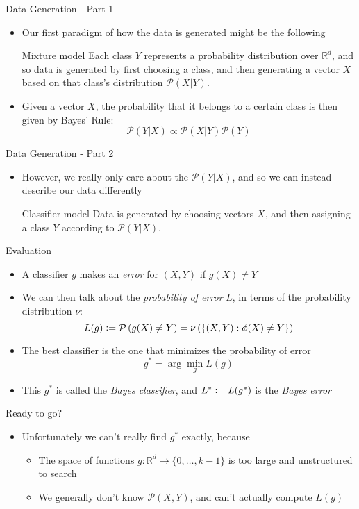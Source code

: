 \documentclass{beamer}
\renewcommand{\Pr}[1]{\mathcal{P} \left( #1 \right)}
\newcommand{\R}{\mathbb{R}}
\newcommand{\defeq}{\vcentcolon=}
\newcommand{\pa}[1]{\left( #1 \right)}
\newcommand{\br}[1]{\left\{ #1 \right\} }
\begin{document}
\begin{frame}{Data Generation - Part 1}
\begin{itemize}
\item Our first paradigm of how the data is generated might be the following
\begin{block}{Mixture model}
Each class $Y$ represents a probability distribution over $\R^d$, and so data is generated by first choosing a class, and then generating a vector $X$ based on that class's distribution $\Pr{X|Y}$.\\
\end{block}
\item Given a vector $X$, the probability that it belongs to a certain class is then given by Bayes' Rule:
\[ \Pr{Y|X} \propto \Pr{X|Y} \Pr{Y} \]
\end{itemize}
\end{frame}

\begin{frame}{Data Generation - Part 2}
\begin{itemize}
\item However, we really only care about the $\Pr{Y|X}$, and so we can instead describe our data differently
\begin{block}{Classifier model}
Data is generated by choosing vectors $X$, and then assigning a class $Y$ according to $\Pr{Y|X}$. 

\end{block}
\end{itemize}
\end{frame}

\begin{frame}{Evaluation}
\begin{itemize}
\item A classifier $g$ makes an \emph{error} for $(X,Y)$ if $g(X) \ne Y$
\item We can then talk about the \emph{probability of error} $L$, in terms of the probability distribution $\nu$:
\[ L(g) \defeq \Pr{g(X) \ne Y} = \nu\pa{ \br{ (X,Y) : \phi(X) \ne Y}}  \]
\item The best classifier is the one that minimizes the probability of error
\[ g^* = \arg \min_g L(g) \]
\item This $g^*$ is called the \emph{Bayes classifier}, and $L^* \defeq L(g^*)$ is the \emph{Bayes error}
\end{itemize}
\end{frame}

\begin{frame}{Ready to go?}
\begin{itemize}
\item Unfortunately we can't really find $g^*$ exactly, because
\begin{itemize}
\item The space of functions $g: \R^d \to \{0,\ldots,k-1\}$ is too large and unstructured to search
\item We generally don't know $\Pr{X,Y}$, and can't actually compute $L(g)$
\end{itemize}
\end{itemize}
\end{frame}
\end{document}
